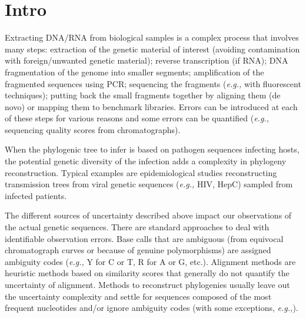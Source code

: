 \documentclass[
]{article}
\newcommand{\eg}{\textit{e.g.,}\xspace}
\begin{document}
\hypertarget{intro}{%
\section{Intro}\label{intro}}

Extracting DNA/RNA from biological samples is a complex process that
involves many steps: extraction of the genetic material of interest
(avoiding contamination with foreign/unwanted genetic material); reverse
transcription (if RNA); DNA fragmentation of the genome into smaller
segments; amplification of the fragmented sequences using PCR;
sequencing the fragments (\eg with fluorescent techniques); putting back
the small fragments together by aligning them (de novo) or mapping them
to benchmark libraries. Errors can be introduced at each of these steps
for various reasons
\citep[\citet{oraweAccountingUncertaintyDNA2015}]{beerenwinkelUltradeepSequencingAnalysis2011}
and some errors can be quantified (\eg sequencing quality scores from
chromatographs).

When the phylogenic tree to infer is based on pathogen sequences
infecting hosts, the potential genetic diversity of the infection adds a
complexity in phylogeny reconstruction. Typical examples are
epidemiological studies reconstructing transmission trees from viral
genetic sequences (\eg HIV, HepC) sampled from infected patients.

The different sources of uncertainty described above impact our
observations of the actual genetic sequences. There are standard
approaches to deal with identifiable observation errors. Base calls that
are ambiguous (from equivocal chromatograph curves or because of genuine
polymorphisms) are assigned ambiguity codes (\eg Y for C or T, R for A
or G, etc.). Alignment methods are heuristic methods based on similarity
scores that generally do not quantify the uncertainty of alignment.
Methods to reconstruct phylogenies usually leave out the uncertainty
complexity and settle for sequences composed of the most frequent
nucleotides and/or ignore ambiguity codes (with some exceptions,
\eg \citet{depristoFrameworkVariationDiscovery2011}).
\end{document}
